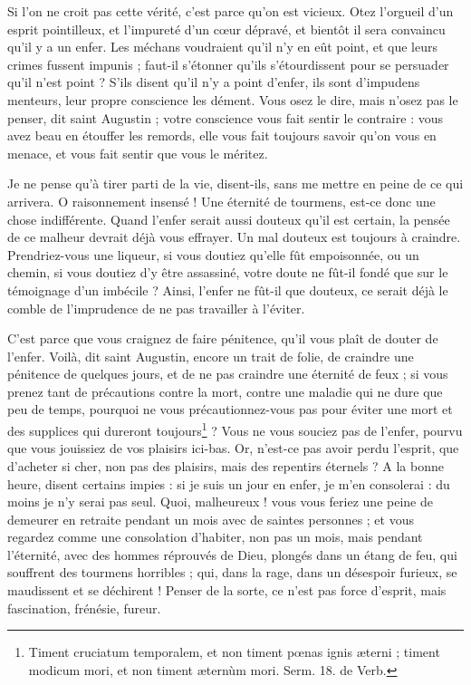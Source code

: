 \documentclass[instructions.tex]{subfiles}
\begin{document}
\secundo Si l’on ne croit pas cette vérité, c’est parce qu’on est vicieux. Otez l’orgueil d’un esprit pointilleux, et l’impureté d’un cœur dépravé, et bientôt il sera convaincu qu’il y a un enfer. Les méchans voudraient qu’il n’y en eût point, et que leurs crimes fussent impunis ; faut-il s’étonner qu’ils s’étourdissent pour se persuader qu’il n’est point ? S’ils disent qu’il n’y a point d’enfer, ils sont d’impudens menteurs, leur propre conscience les dément. Vous osez le dire, mais n’osez pas le penser, dit saint Augustin ; votre conscience vous fait sentir le contraire : vous avez beau en étouffer les remords, elle vous fait toujours savoir qu’on vous en menace, et vous fait sentir que vous le méritez.
 
Je ne pense qu’à tirer parti de la vie, disent-ils, sans me mettre en peine de ce qui arrivera. O raisonnement insensé ! Une éternité de tourmens, est-ce donc une chose indifférente. Quand l’enfer serait aussi douteux qu’il est certain, la pensée de ce malheur devrait déjà vous effrayer. Un mal douteux est toujours à craindre. Prendriez-vous une liqueur, si vous doutiez qu’elle fût empoisonnée, ou un chemin, si vous doutiez d’y être assassiné, votre doute ne fût-il fondé que sur le témoignage d’un imbécile ? Ainsi, l’enfer ne fût-il que douteux, ce serait déjà le comble de l’imprudence de ne pas travailler à l’éviter.
 
C’est parce que vous craignez de faire pénitence, qu’il vous plaît de douter de l’enfer. Voilà, dit saint Augustin, encore un trait de folie, de craindre une pénitence de quelques jours, et de ne pas craindre une éternité de feux ; si vous prenez tant de précautions contre la mort, contre une maladie qui ne dure que peu de temps, pourquoi ne vous précautionnez-vous pas pour éviter une mort et des supplices qui dureront toujours\footnote{Timent cruciatum temporalem, et non timent pœnas ignis æterni ; timent modicum mori, et non timent æternùm mori. Serm. 18. de Verb.} ? Vous ne vous souciez pas de l’enfer, pourvu que vous jouissiez de vos plaisirs ici-bas. Or, n’est-ce pas avoir perdu l’esprit, que d’acheter si cher, non pas des plaisirs, mais des repentirs éternels ? A la bonne heure, disent certains impies : si je suis un jour en enfer, je m’en consolerai : du moins je n’y serai pas seul. Quoi, malheureux ! vous vous feriez une peine de demeurer en retraite pendant un mois avec de saintes personnes ; et vous regardez comme une consolation d’habiter, non pas un mois, mais pendant l’éternité, avec des hommes réprouvés de Dieu, plongés dans un étang de feu, qui souffrent des tourmens horribles ; qui, dans la rage, dans un désespoir furieux, se maudissent et se déchirent ! Penser de la sorte, ce n’est pas force d’esprit, mais fascination, frénésie, fureur.
 
\end{document}
